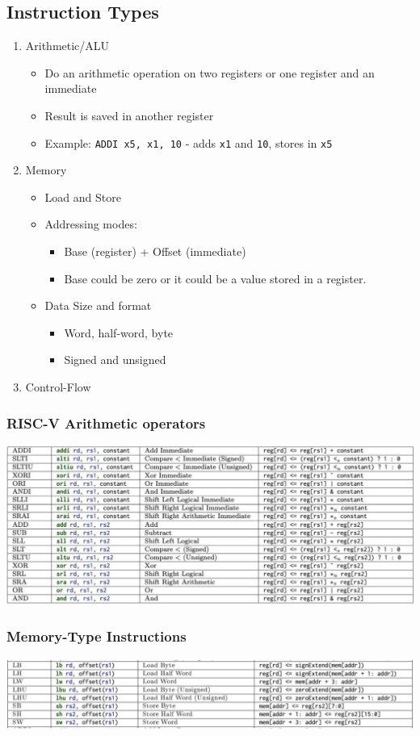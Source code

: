 \documentclass[10pt]{article}
\begin{document}
\subsection*{Instruction Types}
\begin{enumerate}
    \item Arithmetic/ALU
    \begin{itemize}
        \item Do an arithmetic operation on two registers or one register and an immediate
        \item Result is saved in another register
        \item Example: \texttt{ADDI x5, x1, 10} - adds \texttt{x1} and \texttt{10}, stores in \texttt{x5}
    \end{itemize}
    \item Memory
    \begin{itemize}
        \item Load and Store
        \item Addressing modes:
        \begin{itemize}
            \item Base (register) + Offset (immediate)
            \item Base could be zero or it could be a value stored in a register.
        \end{itemize}
        \item Data Size and format
        \begin{itemize}
            \item Word, half-word, byte
            \item Signed and unsigned
        \end{itemize}
    \end{itemize}
    \item Control-Flow
\end{enumerate}
\subsubsection*{RISC-V Arithmetic operators}
\begin{center}
\includegraphics*[scale=0.4]{W1_4.png}
\end{center}
\subsubsection*{Memory-Type Instructions}
\begin{center}
\includegraphics*[scale=0.4]{W1_5.png}
\end{center}
\end{document}
